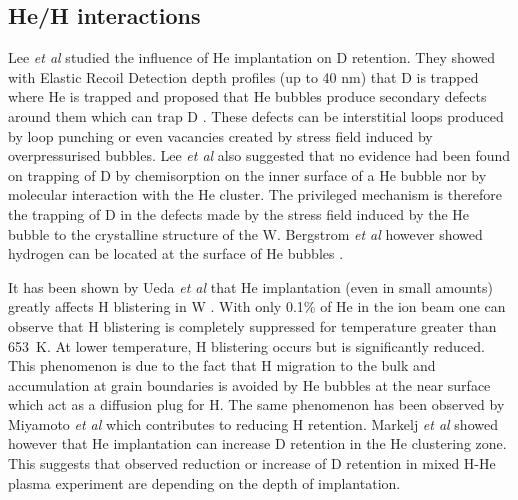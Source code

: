 

\subsection{He/H interactions}
Lee \textit{et al} studied the influence of He implantation on D \gls{retention}.
They showed with Elastic Recoil Detection depth profiles (up to 40 nm) that D is trapped where He is trapped and proposed that He bubbles produce secondary defects around them which can trap D .
These defects can be interstitial loops produced by \gls{loop punching} or even vacancies created by stress field induced by overpressurised bubbles.
Lee \textit{et al} also suggested that no evidence had been found on trapping of D by chemisorption on the inner surface of a He bubble nor by molecular interaction with the He cluster.
The privileged mechanism is therefore the trapping of D in the defects made by the stress field induced by the He bubble to the crystalline structure of the W.
Bergstrom \textit{et al} however showed hydrogen can be located at the surface of He bubbles .

It has been shown by Ueda \textit{et al} that He implantation (even in small amounts) greatly affects \gls{H} blistering in W .
With only 0.1\% of He in the ion beam one can observe that \gls{H} blistering is completely suppressed for temperature greater than \SI{653}{K}.
At lower temperature, \gls{H} blistering occurs but is significantly reduced.
This phenomenon is due to the fact that \gls{H} migration to the bulk and accumulation at grain boundaries is avoided by He bubbles at the near surface which act as a diffusion plug for H.
The same phenomenon has been observed by Miyamoto \textit{et al}  which contributes to reducing \gls{H} \gls{retention}.
Markelj \textit{et al}  showed however that He implantation can increase D \gls{retention} in the He clustering zone.
This suggests that observed reduction or increase of D \gls{retention} in mixed H-He \gls{plasma} experiment are depending on the depth of implantation.

